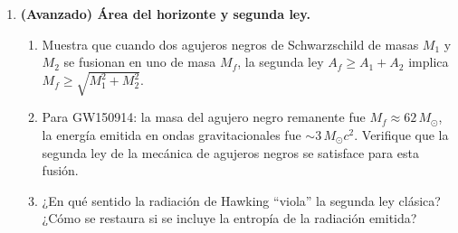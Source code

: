 \begin{enumerate}[leftmargin=2em, label=\textbf{P\thechapter.\arabic*.}]
  \item \textbf{(Avanzado) Área del horizonte y segunda ley.}
  \begin{enumerate}[label=(\alph*)]
    \item Muestra que cuando dos agujeros negros de Schwarzschild de masas $M_1$ y $M_2$ se fusionan en uno de masa $M_f$, la segunda ley $A_f \geq A_1 + A_2$ implica $M_f \geq \sqrt{M_1^2 + M_2^2}$.
    \item Para GW150914: la masa del agujero negro remanente fue $M_f \approx 62\,M_\odot$, la energía emitida en ondas gravitacionales fue $\sim 3\,M_\odot c^2$. Verifique que la segunda ley de la mecánica de agujeros negros se satisface para esta fusión.
    \item ¿En qué sentido la radiación de Hawking ``viola'' la segunda ley clásica? ¿Cómo se restaura si se incluye la entropía de la radiación emitida?
  \end{enumerate}

\end{enumerate}
